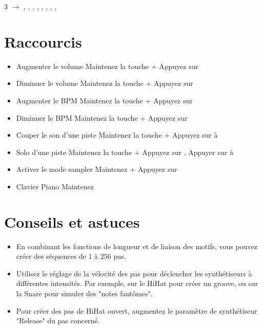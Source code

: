 \documentclass[8pt]{extarticle}
\begin{document}
\begin{multicols*}{3}
 $\rightarrow$ , , , , , , , , 

\section{Raccourcis}

\begin{itemize}
    \item[] Augmenter le volume \dotfill Maintenez la touche  + Appuyez sur 
    \item[] Diminuer le volume \dotfill Maintenez la touche  + Appuyez sur 
    \item[] Augmenter le BPM \dotfill Maintenez la touche  + Appuyez sur 
    \item[] Diminuer le BPM \dotfill Maintenez la touche  + Appuyez sur 
    \item[] Couper le son d'une piste \dotfill Maintenez la touche  + Appuyez sur  à 
    \item[] Solo d'une piste \dotfill Maintenez la touche  + Appuyez sur , Appuyer sur  à 
    \item[] Activer le mode sampler \dotfill Maintenez  + Appuyez sur 
    \item[] Clavier Piano \dotfill Maintenez 
\end{itemize}

\section{Conseils et astuces}

\begin{itemize}
    \item En combinant les fonctions de longueur et de liaison des motifs, vous pouvez créer des séquences de 1 à 256 pas.

    \item Utilisez le réglage de la vélocité des pas pour déclencher les synthétiseurs à différentes intensités. Par exemple, sur le HiHat pour créer un groove, ou sur la Snare pour simuler des "notes fantômes".

    \item Pour créer des pas de HiHat ouvert, augmentez le paramètre de synthétiseur "Release" du pas concerné.
\end{itemize}


\end{multicols*}
\end{document}
